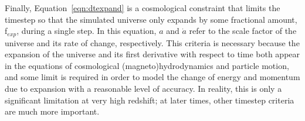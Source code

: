Finally, Equation~\ref{eqn:dtexpand} is a cosmological constraint that
limits the timestep so that the simulated universe only expands by
some fractional amount, f$_{exp}$, during a single step.  In this
equation, $a$ and $\dot{a}$ refer to the scale factor of the universe
and its rate of change, respectively.  This
criteria is necessary because the expansion of the universe and its
first derivative with respect to time both appear in the equations of cosmological (magneto)hydrodynamics and particle motion,
and some limit is required in order to model the change of energy and
momentum due to expansion with a reasonable level of accuracy.  In
reality, this is only a significant limitation at very high redshift;
at later times, other timestep criteria are much more important.